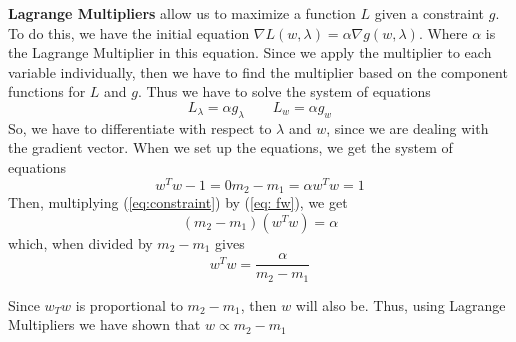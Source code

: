 \documentclass{article}
\begin{document}
		\textbf{Lagrange Multipliers} allow us to maximize a function $L$ given a constraint $g$.
		To do this, we have  the initial equation $\nabla L(w, \lambda) = \alpha \nabla g(w, \lambda)$. Where 
		$\alpha$ is the Lagrange Multiplier in this equation. Since we apply the multiplier to each
		variable individually, then we have to find the multiplier based on the component functions 
		for $L$ and $g$. Thus we have to solve the system of equations 
		\[ L_{\lambda} = \alpha g_{\lambda} \quad\quad L_{w} = \alpha g_{w} \]
		So, we have to differentiate with respect to $\lambda$ and $w$, since we are dealing with the gradient
		vector. When we set up the equations, we get the system of equations
		\begin{subequations}
			\begin{equation}
				w^{T}w -1 = 0
			\end{equation}
			\begin{equation}
				\label{eq: fw}
				m_{2} - m_{1} = \alpha
			\end{equation}
			\begin{equation}
				\label{eq:constraint}
				w^{T}w = 1
			\end{equation}
		\end{subequations}
		Then, multiplying (\ref{eq:constraint}) by (\ref{eq: fw}), we get
		\[(m_{2} - m_{1})(w^{T}w) = \alpha\]
		which, when divided by $m_{2} - m_{1}$ gives 
		\[w^{T}w = \frac{\alpha}{m_{2} - m_{1}}\]

		Since $w_{T}w$ is proportional to $m_{2} - m_{1}$, then $w$ will also be. 
		Thus, using Lagrange Multipliers we have shown that $w \propto m_{2} - m_{1}$ 
\end{document}
